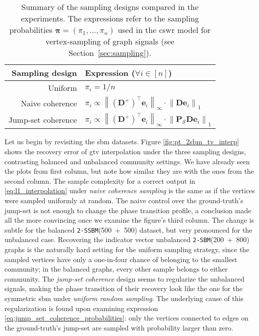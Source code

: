 \begin{table}[H]
    \centering
    \begin{tabularx}{0.6\textwidth}{rl}
        \hline
        Sampling design & Expression ($\forall i \in [n]$) \\
        \hline
        Uniform & $\pi_i = 1/n$ \\
        Naive coherence & $\pi_i \propto \left \| (\mathbf{D}^{+})^\top \mathbf{e}_i \right \|_{\infty} \cdot \left \| \mathbf{D} \mathbf{e}_i \right \|_1$ \\
        Jump-set coherence & $\pi_i \propto \left \| (\mathbf{D}^{+})^\top \mathbf{e}_i \right \|_{\infty} \cdot \left \| \mathbf{P}_\mathcal{S} \mathbf{D} \mathbf{e}_i \right \|_1$ \\
        \hline
    \end{tabularx}
    \caption[Summary of the three sampling designs compared in the experiments]{Summary of the sampling designs compared in the experiments. The expressions refer to the sampling probabilities $\bm{\pi} = (\pi_1, \dots, \pi_n)$ used in the \acrshort{cswr} model for vertex-sampling of graph signals (see Section~\ref{sec:sampling}).}
    \label{tab:summary_sampling_designs}
\end{table}

Let us begin by revisiting the \acrshort{sbm} datasets. Figure \ref{fig:pt_2sbm_tv_interp} shows the recovery error of \acrshort{gtv} interpolation under the three sampling designs, contrasting balanced and unbalanced community settings. We have already seen the plots from first column, but note how similar they are with the ones from the second column. The sample complexity for a correct output in \eqref{eq:l1_interpolation} under \emph{naive coherence sampling} is the same as if the vertices were sampled uniformly at random. The naive control over the ground-truth's jump-set is not enough to change the phase transition profile, a conclusion made all the more convincing once we examine the figure's third column. The change is subtle for the balanced \texttt{2-SSBM}(500~+~500) dataset, but very pronounced for the unbalanced case. Recovering the indicator vector unbalanced \texttt{2-SBM}(200~+~800) graphs is the naturally hard setting for the uniform sampling strategy, since the sampled vertices have only a one-in-four chance of belonging to the smallest community; in the balanced graphs, every other sample belongs to either community. The \emph{jump-set coherence} design seems to regularize the unbalanced signals, making the phase transition of their recovery look like the one for the symmetric \acrshort{sbm} under \emph{uniform random sampling}. The underlying cause of this regularization is found upon examining expression \eqref{eq:jump_set_coherence_probabilities}: only the vertices connected to edges on the ground-truth's jump-set are sampled with probability larger than zero.

